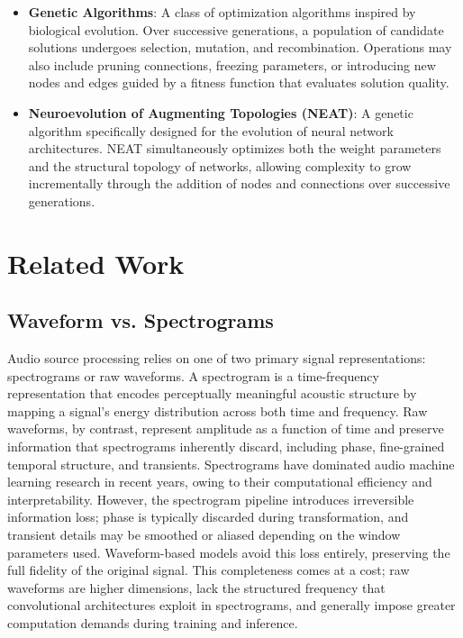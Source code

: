 \documentclass{article}
\begin{document}
\begin{itemize}
    \item \textbf{Genetic Algorithms}: A class of optimization algorithms inspired by biological evolution. Over successive generations, a population of candidate solutions undergoes selection, mutation, and recombination. Operations may also include pruning connections, freezing parameters, or introducing new nodes and edges guided by a fitness function that evaluates solution quality.
    \item \textbf{Neuroevolution of Augmenting Topologies (NEAT)}:  A genetic algorithm specifically designed for the evolution of neural network architectures. NEAT simultaneously optimizes both the weight parameters and the structural topology of networks, allowing complexity to grow incrementally through the addition of nodes and connections over successive generations.
\end{itemize}

\section{Related Work}

\subsection{Waveform vs. Spectrograms}
Audio source processing relies on one of two primary signal representations: spectrograms or raw waveforms. A spectrogram is a time-frequency representation that encodes perceptually meaningful acoustic structure by mapping a signal’s energy distribution across both time and frequency. Raw waveforms, by contrast, represent amplitude as a function of time and preserve information that spectrograms inherently discard, including phase, fine-grained temporal structure, and transients.
Spectrograms have dominated audio machine learning research in recent years, owing to their computational efficiency and interpretability. However, the spectrogram pipeline introduces irreversible information loss; phase is typically discarded during transformation, and transient details may be smoothed or aliased depending on the window parameters used. Waveform-based models avoid this loss entirely, preserving the full fidelity of the original signal. This completeness comes at a cost; raw waveforms are higher dimensions, lack the structured frequency that convolutional architectures exploit in spectrograms, and generally impose greater computation demands during training and inference.\\
\end{document}
